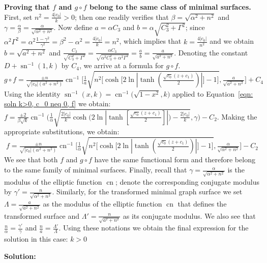 \documentclass[12pt]{article}
\theoremstyle{plain}
\theoremstyle{definition}
\theoremstyle{remark}
\begin{document}
 \textbf{Proving that \(f\) and \(g\circ f\) belong to the same class of minimal surfaces.} First, set \(n^2=\tfrac{4|c_0|}{k}>0\); then one readily verifies that \(\beta=\sqrt{\alpha^2+n^2}\) and \(\gamma=\tfrac{\alpha}{\beta}=\tfrac{\alpha}{\sqrt{\alpha^2+n^2}}\). Now define \(a=\alpha C_3\) and \(b=\alpha\sqrt{C_3^2+\Gamma^2}\); since \(\alpha^2\Gamma^2=\alpha^2\tfrac{1-\gamma^2}{\gamma^2}=\beta^2-\alpha^2=\tfrac{4|c_0|}{k}=n^2\), which implies that \(k=\tfrac{4|c_0|}{n^2}\) and we obtain \(b=\sqrt{a^2+n^2}\) and \(\tfrac{C_3}{\sqrt{C_3^2+\Gamma^2}}=\tfrac{\alpha C_3}{\sqrt{\alpha^2 C_3^2+\alpha^2\Gamma^2}}=\tfrac{a}{b}=\tfrac{a}{\sqrt{a^2+n^2}}\). Denoting the constant \(D+\operatorname{sn}^{-1}(1,k)\) by \(C_4\), we arrive at a formula for \(g\circ f\).
 \footnotesize\[
   g\circ f=\tfrac{\pm n}{\sqrt{|c_0|(a^2+n^2)}}\operatorname{cn}^{-1}\Big[\tfrac{1}{a}\sqrt{n^2\big[\cosh\big[2\ln|\tanh(\tfrac{\sqrt{c_0}(z + c_1)}{2})|\big]-1\big]},\tfrac{a}{\sqrt{a^2+n^2}}\Big]+C_4
 \]\normalsize
 Using the identity \(\operatorname{sn}^{-1}(x,k)=\operatorname{cn}^{-1}\big(\sqrt{1-x^2},k\big)\) applied to Equation~\ref{eqn: soln k>0, c_0 neq 0, f} we obtain: \footnotesize\(f=\tfrac{\pm2}{\beta\sqrt k}\operatorname{cn}^{-1}\Big(\tfrac{1}{\alpha}\sqrt{\tfrac{2|c_0|}{k}\cosh\big(2\ln|\tanh[\tfrac{\sqrt{c_0}(z + c_1)}{2}]|\big)-\tfrac{2|c_0|}{k}},\gamma\Big)-C_2\)\normalsize.  Making the appropriate substitutions, we obtain:
 \footnotesize\[
   f=\tfrac{\pm n}{\sqrt{|c_0|(\alpha^2+n^2)}}\operatorname{cn}^{-1}\Big[\tfrac{1}{\alpha}\sqrt{n^2\big[\cosh\big[2\ln|\tanh(\tfrac{\sqrt{c_0}(z + c_1)}{2})|\big]-1\big]},\tfrac{\alpha}{\sqrt{\alpha^2+n^2}}\Big]-C_2
 \]\normalsize
  We see that both \(f\) and \(g\circ f\) have the same functional form and therefore belong to the same family of minimal surfaces. Finally, recall that \(\gamma=\tfrac{\alpha}{\sqrt{\alpha^2+n^2}}\) is the modulus of the elliptic function \(\operatorname{cn}\); denote the corresponding conjugate modulus by \(\gamma'=\tfrac{n}{\sqrt{\alpha^2+n^2}}\). Similarly, for the transformed minimal graph surface we set \(\Lambda=\tfrac{a}{\sqrt{a^2+n^2}}\) as the modulus of the elliptic function \(\operatorname{cn}\) that defines the transformed surface and \(\Lambda'=\tfrac{n}{\sqrt{a^2+n^2}}\) as its conjugate modulus. We also see that \(\tfrac{n}{\alpha}=\tfrac{\gamma'}{\gamma}\) and \(\tfrac{n}{a}=\tfrac{\Lambda'}{\Lambda}\). Using these notations we obtain the final expression for the solution in this case: \(k>0\)
  
  \textbf{Solution:}  
  
\end{document}
